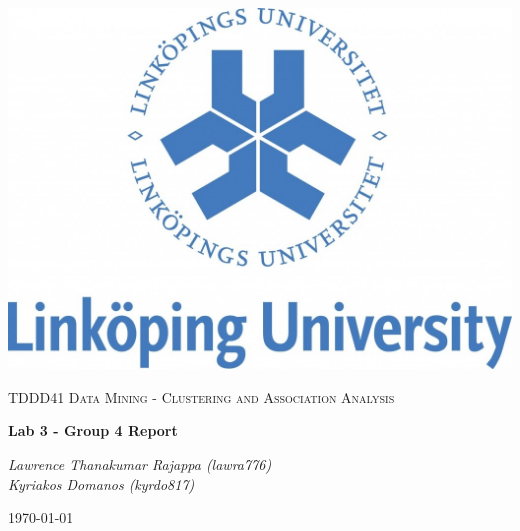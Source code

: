 \documentclass[a4paper,10pt]{article}
\begin{document}
\begin{titlepage}
	\centering
	\includegraphics[width=.6\textwidth]{liu-logo.png}\par
	\vfill
	{\scshape\Large TDDD41 Data Mining - Clustering and Association Analysis\par}
	{\huge\bfseries Lab 3 -  Group 4 Report\par}
	\vspace{0.5cm}
    {\large\itshape Lawrence Thanakumar Rajappa (lawra776)\\
     \large\itshape Kyriakos Domanos (kyrdo817)\par}
	\vfill
	{\large \today\par}
\end{titlepage}
\end{document}
